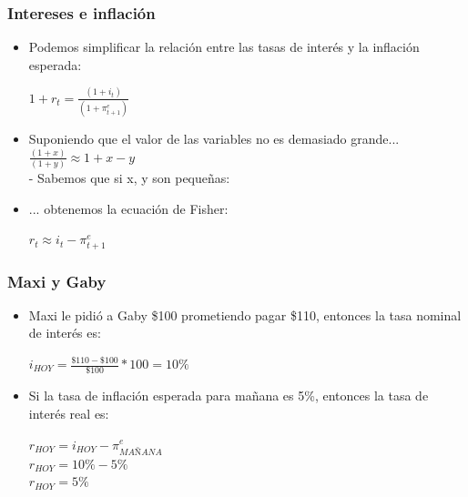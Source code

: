 \documentclass{beamer}
\begin{document}
\begin{frame}
\frametitle{Intereses e inflación}
\begin{itemize}
    \item Podemos simplificar la relación entre las tasas de interés y la inflación esperada:
    \vspace{2mm}
    \begin{center}
        $1+r_t=\frac{(1+i_t)}{(1+\pi_{t+1}^e)}$
    \end{center}
        \vspace{2mm}
    \item Suponiendo que el valor de las variables no es demasiado grande... $\frac{(1+x)}{(1+y)} \approx 1 + x - y $\\
    - Sabemos que si x, y son pequeñas:     
    \item ... obtenemos la ecuación de Fisher: 
    \vspace{2mm}
        \begin{center}
        $r_t \approx i_t - \pi_{t+1}^e$
    \end{center}
\end{itemize}
\end{frame}


\begin{frame}
\frametitle{Maxi y Gaby}
\begin{itemize}
    \item Maxi le pidió a Gaby \$100 prometiendo pagar \$110, entonces la tasa nominal de interés es:
    \vspace{2mm}
    \begin{center}
        $i_{HOY}=\frac{\$110 - \$100}{\$100} * 100 = 10\%$
    \end{center}
        \vspace{2mm}
    \item Si la tasa de inflación esperada para mañana es 5\%, entonces la tasa de interés real es: \\
    \begin{center}
        $r_{HOY} = i_{HOY}-\pi_{MAÑANA}^e$ \\
        \vspace{2mm}
        $r_{HOY} = 10\%-5\% $ \\
        \vspace{2mm}
        $r_{HOY} = 5\%$
    \end{center}
\end{itemize}
\end{frame}
\end{document}
